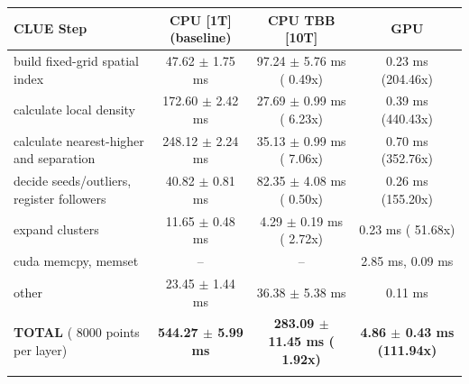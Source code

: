     \begin{tabular}{l|c|c|c}
    \hline
    CLUE Step                                 & CPU [1T] (baseline)         & CPU TBB [10T]                         & GPU                       \\ \hline
    build fixed-grid spatial index            &  47.62 $\pm$  1.75 ms       &  97.24 $\pm$  5.76 ms ( 0.49x)        &   0.23 ms (204.46x)       \\
    calculate local density                   & 172.60 $\pm$  2.42 ms       &  27.69 $\pm$  0.99 ms ( 6.23x)        &   0.39 ms (440.43x)       \\
    calculate nearest-higher and separation   & 248.12 $\pm$  2.24 ms       &  35.13 $\pm$  0.99 ms ( 7.06x)        &   0.70 ms (352.76x)       \\
    decide seeds/outliers, register followers &  40.82 $\pm$  0.81 ms       &  82.35 $\pm$  4.08 ms ( 0.50x)        &   0.26 ms (155.20x)       \\
    expand clusters                           &  11.65 $\pm$  0.48 ms       &   4.29 $\pm$  0.19 ms ( 2.72x)        &   0.23 ms ( 51.68x)       \\ \hline
    cuda memcpy, memset                       & --                          & --                                    &   2.85 ms,   0.09 ms      \\
    other                                     &  23.45 $\pm$  1.44 ms       &  36.38 $\pm$  5.38 ms                 &   0.11 ms                 \\ \hline
    \textbf{TOTAL} ( 8000 points per layer)   & \textbf{544.27 $\pm$  5.99 ms} & \textbf{283.09 $\pm$ 11.45 ms ( 1.92x)} & \textbf{  4.86 $\pm$  0.43 ms (111.94x)}  \\
    \hline
    \multicolumn{4}{c}{}
    \end{tabular}
    \linebreak


